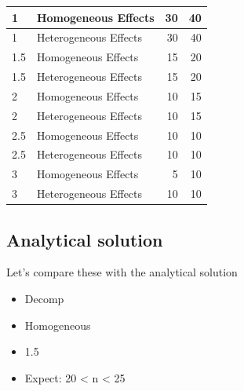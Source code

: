 \documentclass[
]{article}
\newenvironment{Shaded}{\begin{snugshade}}{\end{snugshade}}
\newcommand{\AttributeTok}[1]{\textcolor[rgb]{0.77,0.63,0.00}{#1}}
\newcommand{\DecValTok}[1]{\textcolor[rgb]{0.00,0.00,0.81}{#1}}
\newcommand{\FloatTok}[1]{\textcolor[rgb]{0.00,0.00,0.81}{#1}}
\newcommand{\FunctionTok}[1]{\textcolor[rgb]{0.00,0.00,0.00}{#1}}
\newcommand{\NormalTok}[1]{#1}
\newcommand{\OtherTok}[1]{\textcolor[rgb]{0.56,0.35,0.01}{#1}}
\newcommand{\SpecialCharTok}[1]{\textcolor[rgb]{0.00,0.00,0.00}{#1}}
\newcommand{\StringTok}[1]{\textcolor[rgb]{0.31,0.60,0.02}{#1}}
\begin{document}
\begin{table}[H]
\begin{tabular}{l|l|r|r}
\hline
\hspace{1em}1 & Homogeneous Effects & 30 & 40\\
\hline
\hspace{1em}1 & Heterogeneous Effects & 30 & 40\\
\hline
\hspace{1em}1.5 & Homogeneous Effects & 15 & 20\\
\hline
\hspace{1em}1.5 & Heterogeneous Effects & 15 & 20\\
\hline
\hspace{1em}2 & Homogeneous Effects & 10 & 15\\
\hline
\hspace{1em}2 & Heterogeneous Effects & 10 & 15\\
\hline
\hspace{1em}2.5 & Homogeneous Effects & 10 & 10\\
\hline
\hspace{1em}2.5 & Heterogeneous Effects & 10 & 10\\
\hline
\hspace{1em}3 & Homogeneous Effects & 5 & 10\\
\hline
\hspace{1em}3 & Heterogeneous Effects & 10 & 10\\
\hline
\end{tabular}
\end{table}

\hypertarget{analytical-solution}{%
\subsection{Analytical solution}\label{analytical-solution}}

Let's compare these with the analytical solution

\begin{itemize}
\item
  Decomp
\item
  Homogeneous
\item
  1.5
\item
  Expect: 20 \textless{} n \textless{} 25
\end{itemize}

\begin{Shaded}
\end{Shaded}
\end{document}
